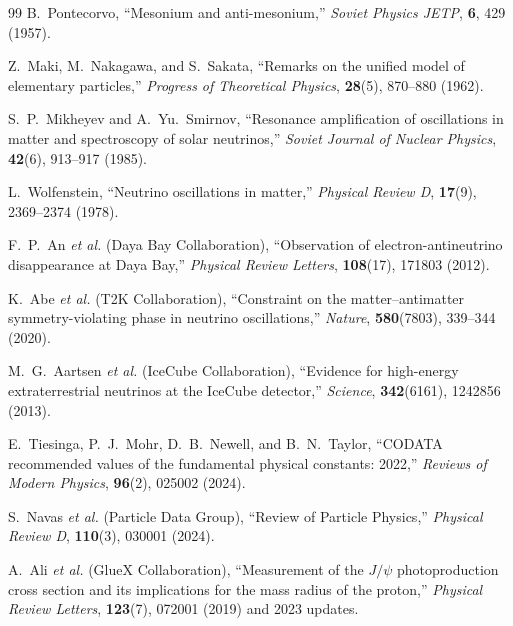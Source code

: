 \documentclass[12pt,a4paper]{article}
\begin{document}
\begin{thebibliography}{99}
			B.~Pontecorvo, 
			``Mesonium and anti-mesonium,''
			\textit{Soviet Physics JETP}, \textbf{6}, 429 (1957).
			
			Z.~Maki, M.~Nakagawa, and S.~Sakata, 
			``Remarks on the unified model of elementary particles,''
			\textit{Progress of Theoretical Physics}, \textbf{28}(5), 870--880 (1962).
			
			S.~P.~Mikheyev and A.~Yu.~Smirnov, 
			``Resonance amplification of oscillations in matter and spectroscopy of solar neutrinos,''
			\textit{Soviet Journal of Nuclear Physics}, \textbf{42}(6), 913--917 (1985).
			
			L.~Wolfenstein, 
			``Neutrino oscillations in matter,''
			\textit{Physical Review D}, \textbf{17}(9), 2369--2374 (1978).
			
			F.~P.~An \textit{et al.} (Daya Bay Collaboration), 
			``Observation of electron-antineutrino disappearance at Daya Bay,''
			\textit{Physical Review Letters}, \textbf{108}(17), 171803 (2012).
			
			K.~Abe \textit{et al.} (T2K Collaboration), 
			``Constraint on the matter--antimatter symmetry-violating phase in neutrino oscillations,''
			\textit{Nature}, \textbf{580}(7803), 339--344 (2020).
			
			M.~G.~Aartsen \textit{et al.} (IceCube Collaboration), 
			``Evidence for high-energy extraterrestrial neutrinos at the IceCube detector,''
			\textit{Science}, \textbf{342}(6161), 1242856 (2013).
			
			E.~Tiesinga, P.~J.~Mohr, D.~B.~Newell, and B.~N.~Taylor, 
			``CODATA recommended values of the fundamental physical constants: 2022,''
			\textit{Reviews of Modern Physics}, \textbf{96}(2), 025002 (2024).
			
			S.~Navas \textit{et al.} (Particle Data Group), 
			``Review of Particle Physics,''
			\textit{Physical Review D}, \textbf{110}(3), 030001 (2024).
			
			A.~Ali \textit{et al.} (GlueX Collaboration), 
			``Measurement of the $J/\psi$ photoproduction cross section and its implications for the mass radius of the proton,''
			\textit{Physical Review Letters}, \textbf{123}(7), 072001 (2019) and 2023 updates.
			

\end{thebibliography}
\end{document}
